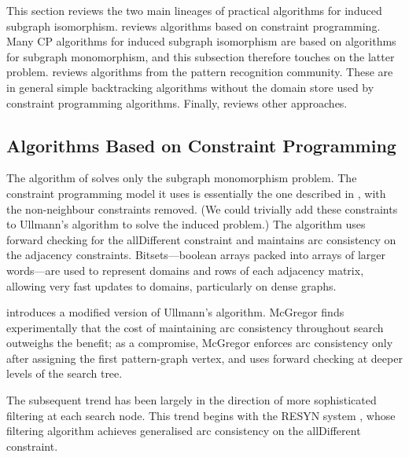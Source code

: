 This section reviews the two main lineages of practical algorithms
for induced subgraph isomorphism.   reviews algorithms
based on constraint programming.  Many CP algorithms for induced subgraph
isomorphism are based on algorithms for subgraph monomorphism, and this
subsection therefore touches on the latter problem.  
reviews algorithms from the pattern recognition community. These are in general
simple backtracking algorithms without the domain store used by constraint
programming algorithms.  Finally,  reviews
other approaches.

\subsection{Algorithms Based on Constraint Programming}\label{subsec:cp-sip}

The algorithm of \citet{ullmann1976algorithm} solves only the subgraph
monomorphism problem.  The constraint programming model it uses is essentially
the one described in , with the non-neighbour
constraints removed.  (We could trivially add these constraints to Ullmann's
algorithm to solve the induced problem.) The algorithm uses forward checking
for the allDifferent constraint and maintains arc consistency on the adjacency
constraints.
Bitsets---boolean arrays
packed into arrays of larger words---are used to represent domains and rows of each
adjacency matrix, allowing very fast updates to domains, particularly on dense
graphs.

\citet{DBLP:journals/isci/McGregor79} introduces a modified version of
Ullmann's algorithm.  McGregor finds experimentally that the cost of
maintaining arc consistency throughout search outweighs the benefit; as a
compromise, McGregor enforces arc consistency only after assigning the first
pattern-graph vertex, and uses forward checking at deeper levels of the search
tree.

The subsequent trend has been largely in the direction of more sophisticated
filtering at each search node.  This trend begins with the RESYN system
\citep{vism92,regin1995developpement}, whose filtering algorithm achieves
generalised arc consistency on the allDifferent constraint.

